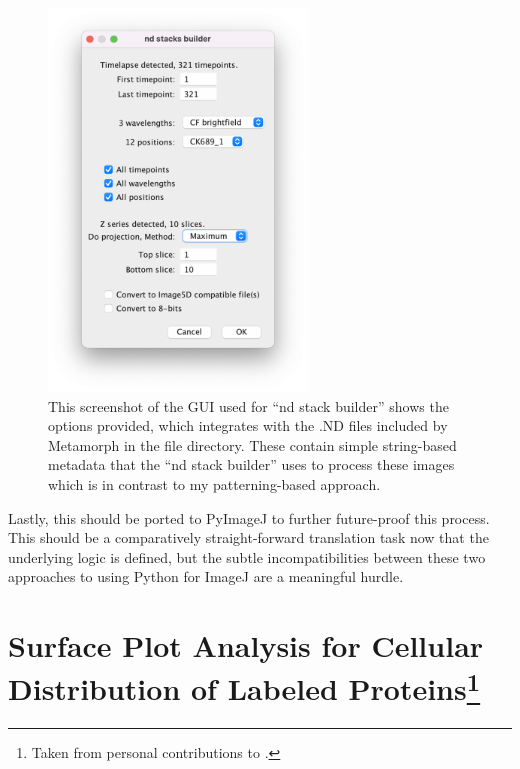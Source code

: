 \begin{figure}
\centering
\includegraphics[height=4in]{images/ndstackbuilder.png}
\caption[GUI for the existing ``nd stack builder'' script]{This screenshot of the GUI used for ``nd stack builder'' shows the options provided, which integrates with the .ND files included by Metamorph in the file directory. These contain simple string\hyp{}based metadata that the ``nd stack builder'' uses to process these images which is in contrast to my patterning\hyp{}based approach.}
\label{figure:ndstackbuilder}
\end{figure}

Lastly, this should be ported to PyImageJ to further future\hyp{}proof this process. This should be a comparatively straight\hyp{}forward translation task now that the underlying logic is defined, but the subtle incompatibilities between these two approaches to using Python for ImageJ are a meaningful hurdle.

\section[Surface Plot Analysis for Cellular Distribution of Labeled Proteins]{Surface Plot Analysis for Cellular Distribution of Labeled Proteins\footnote{Taken from personal contributions to .}}

